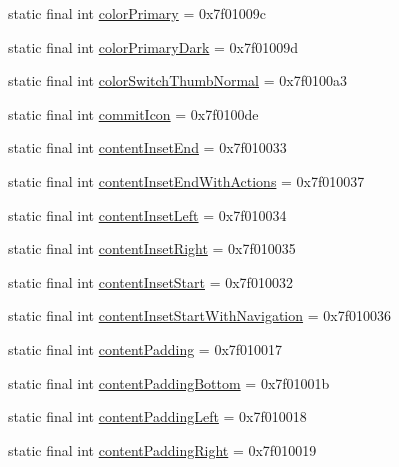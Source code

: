 \begin{CompactItemize}
static final int \hyperlink{classandroid_1_1support_1_1v7_1_1palette_1_1_r_1_1attr_ec1d59ac07d268f5fa695c7aabebc079}{colorPrimary} = 0x7f01009c
\item 
static final int \hyperlink{classandroid_1_1support_1_1v7_1_1palette_1_1_r_1_1attr_c3cf8c7e5077fd56d690e7404216f2e0}{colorPrimaryDark} = 0x7f01009d
\item 
static final int \hyperlink{classandroid_1_1support_1_1v7_1_1palette_1_1_r_1_1attr_5ae77e782587dc5dcdc9db499d3038b1}{colorSwitchThumbNormal} = 0x7f0100a3
\item 
static final int \hyperlink{classandroid_1_1support_1_1v7_1_1palette_1_1_r_1_1attr_68bb5c245171eb29912b4d3434e1969c}{commitIcon} = 0x7f0100de
\item 
static final int \hyperlink{classandroid_1_1support_1_1v7_1_1palette_1_1_r_1_1attr_a57b14d48ec1e960534977967c7754a0}{contentInsetEnd} = 0x7f010033
\item 
static final int \hyperlink{classandroid_1_1support_1_1v7_1_1palette_1_1_r_1_1attr_8b58e55b7040b6f7a9b02757cf2c0c09}{contentInsetEndWithActions} = 0x7f010037
\item 
static final int \hyperlink{classandroid_1_1support_1_1v7_1_1palette_1_1_r_1_1attr_4a66e002af4ff2559f80860dc6bf6e04}{contentInsetLeft} = 0x7f010034
\item 
static final int \hyperlink{classandroid_1_1support_1_1v7_1_1palette_1_1_r_1_1attr_01c7099e6d43b85a87c4fdbb4b0e6cc6}{contentInsetRight} = 0x7f010035
\item 
static final int \hyperlink{classandroid_1_1support_1_1v7_1_1palette_1_1_r_1_1attr_a42dcab62f2e0be87fc10fa9606c2097}{contentInsetStart} = 0x7f010032
\item 
static final int \hyperlink{classandroid_1_1support_1_1v7_1_1palette_1_1_r_1_1attr_4160e5c6d82761d831a05d2e6fc6c735}{contentInsetStartWithNavigation} = 0x7f010036
\item 
static final int \hyperlink{classandroid_1_1support_1_1v7_1_1palette_1_1_r_1_1attr_eb4ceadb1b14d3d6813615f538a4d65d}{contentPadding} = 0x7f010017
\item 
static final int \hyperlink{classandroid_1_1support_1_1v7_1_1palette_1_1_r_1_1attr_0b15db9b22312d172b84d0f8f3e2fb5e}{contentPaddingBottom} = 0x7f01001b
\item 
static final int \hyperlink{classandroid_1_1support_1_1v7_1_1palette_1_1_r_1_1attr_965983cd116bdf10e678e216fd6fd693}{contentPaddingLeft} = 0x7f010018
\item 
static final int \hyperlink{classandroid_1_1support_1_1v7_1_1palette_1_1_r_1_1attr_35b3edb9d87fc256a4a41d9972bfbe5a}{contentPaddingRight} = 0x7f010019

\end{CompactItemize}
